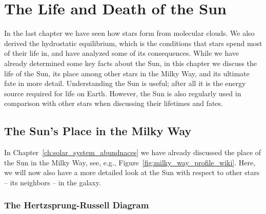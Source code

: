 
\chapter{The Life and Death of the Sun}

In the last chapter we have seen how stars form from molecular clouds. We also derived the hydrostatic equilibrium, which is the conditions that stars spend most of their life in, and have analyzed some of its consequences. While we have already determined some key facts about the Sun, in this chapter we discuss the life of the Sun, its place among other stars in the Milky Way, and its ultimate fate in more detail. Understanding the Sun is useful; after all it is the energy source required for life on Earth. However, the Sun is also regularly used in comparison with other stars when discussing their lifetimes and fates.

\section{The Sun's Place in the Milky Way}

In Chapter~\ref{ch:solar_system_abundnaces} we have already discussed the place of the Sun in the Milky Way, see, e.g., Figure~\ref{fig:milky_way_profile_wiki}. Here, we will now also have a more detailed look at the Sun with respect to other stars -- its neighbors -- in the galaxy.

\subsection{The Hertzsprung-Russell Diagram}

